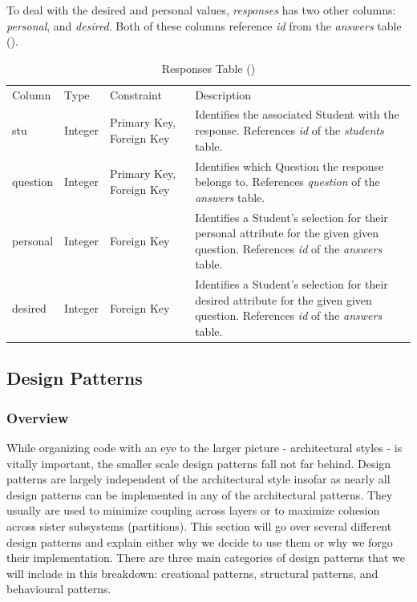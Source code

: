\documentclass[12pt,letterpaper]{article}
\begin{document}
To deal with the desired and personal values, \textit{responses} has two other columns: \textit{personal}, and \textit{desired}. Both of these columns reference \textit{id} from the \textit{answers} table ().

\begin{table}[H]
	\caption{Responses Table ()} 
	\begin{tabu} to \textwidth {l l X X[4]}
		\tableheader{}Column & Type & Constraint & Description \\
		stu      & Integer & Primary Key,\newline
		                     Foreign Key          & Identifies the associated Student with the response. References \textit{id} of the 
		                                            \textit{students} table. \\
		question & Integer & Primary Key,\newline
		                     Foreign Key          & Identifies which Question the response belongs to. References \textit{question}
		                                            of the \textit{answers} table. \\
		personal & Integer & Foreign Key          & Identifies a Student's selection for their personal attribute for the given
		                                            given question. References \textit{id} of the \textit{answers} table. \\
		desired  & Integer & Foreign Key          & Identifies a Student's selection for their desired attribute for the given
		                                            given question. References \textit{id} of the \textit{answers} table. \\
	\end{tabu}
\end{table}

\subsection{Design Patterns}
\subsubsection{Overview}
While organizing code with an eye to the larger picture - architectural styles - is vitally important, the smaller scale design patterns fall not far behind. Design patterns are largely independent of the architectural style insofar as nearly all design patterns can be implemented in any of the architectural patterns. They usually are used to minimize coupling across layers or to maximize cohesion across sister subsystems (partitions). This section will go over several different design patterns and explain either why we decide to use them or why we forgo their implementation. There are three main categories of design patterns that we will include in this breakdown: creational patterns, structural patterns, and behavioural patterns.
\end{document}
